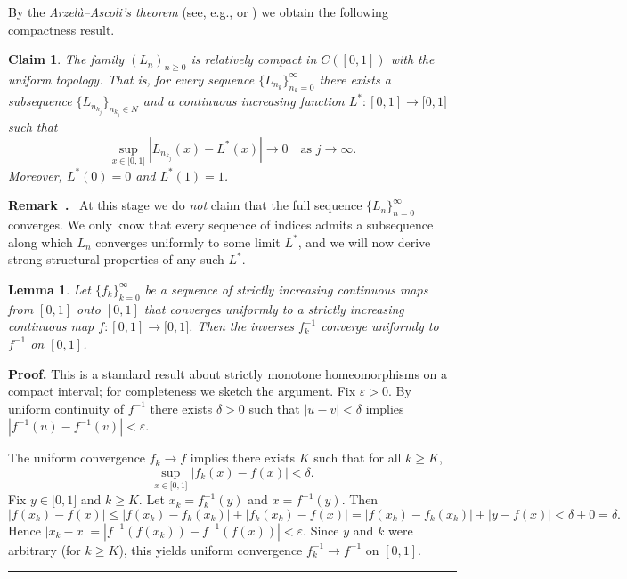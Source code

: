 \documentclass[onecolumn]{article}
\newtheorem{claim}[theorem]{Claim}
\newtheorem{lemma}[theorem]{Lemma}
\newenvironment{remark}{  \refstepcounter{theorem}  \par\medskip\noindent\textbf{Remark~\thetheorem.}\rmfamily\ }{\par\medskip}
\newenvironment{proof}[1][Proof]{\noindent\textbf{#1.} }{\ \rule{0.5em}{0.5em}}
\begin{document}
By the \textit{Arzel\`{a}--Ascoli's theorem} (see, e.g., \cite[Theorem 11.28]%
{[45]} or \cite[Theorem 14]{[46]}) we obtain the following compactness
result.

\begin{claim}
\label{AA} The family $(L_{n})_{n\geq 0}$ is relatively compact in $C([0,1])$
with the uniform topology. That is, for every sequence $\{L_{n_{k}}%
\}_{n_{k}=0}^{\infty }$ there exists a subsequence $\{L_{n_{k_{j}}}%
\}_{n_{k_{j}}\in N}$ and a continuous increasing function $L^{\ast
}:[0,1]\rightarrow \lbrack 0,1]$ such that 
\begin{equation}
\sup_{x\in \lbrack 0,1]}|L_{n_{k_{j}}}(x)-L^{\ast }(x)|\longrightarrow
0\quad \text{as }j\rightarrow \infty .  \label{506}
\end{equation}%
Moreover, $L^{\ast }(0)=0$ and $L^{\ast }(1)=1$.
\end{claim}

\begin{remark}
\label{AAr} At this stage we do \emph{not} claim that the full sequence $%
\{L_{n}\}_{n=0}^{\infty }$ converges. We only know that every sequence of
indices admits a subsequence along which $L_{n}$ converges uniformly to some
limit $L^{\ast }$, and we will now derive strong structural properties of
any such $L^{\ast }$.
\end{remark}

\begin{lemma}
\label{inverse} Let $\{f_{k}\}_{k=0}^{\infty }$ be a sequence of strictly
increasing continuous maps from $[0,1]$ onto $[0,1]$ that converges
uniformly to a strictly increasing continuous map $f:[0,1]\rightarrow
\lbrack 0,1]$. Then the inverses $f_{k}^{-1}$ converge uniformly to $f^{-1}$
on $[0,1]$.
\end{lemma}

\begin{proof}
\noindent This is a standard result about strictly monotone homeomorphisms
on a compact interval; for completeness we sketch the argument. Fix $%
\varepsilon >0$. By uniform continuity of $f^{-1}$ there exists $\delta >0$
such that $|u-v|<\delta $ implies $|f^{-1}(u)-f^{-1}(v)|<\varepsilon $.

The uniform convergence $f_{k}\rightarrow f$ implies there exists $K$ such
that for all $k\geq K$, 
\begin{equation}
\sup_{x\in \lbrack 0,1]}|f_{k}(x)-f(x)|<\delta .  \label{507}
\end{equation}%
Fix $y\in \lbrack 0,1]$ and $k\geq K$. Let $x_{k}=f_{k}^{-1}(y)$ and $%
x=f^{-1}(y)$. Then 
\begin{equation}
|f(x_{k})-f(x)|\leq
|f(x_{k})-f_{k}(x_{k})|+|f_{k}(x_{k})-f(x)|=|f(x_{k})-f_{k}(x_{k})|+|y-f(x)|<\delta +0=\delta .
\label{508}
\end{equation}%
Hence $|x_{k}-x|=|f^{-1}(f(x_{k}))-f^{-1}(f(x))|<\varepsilon $. Since $y$
and $k$ were arbitrary (for $k\geq K$), this yields uniform convergence $%
f_{k}^{-1}\rightarrow f^{-1}$ on $[0,1]$.
\end{proof}
\end{document}
